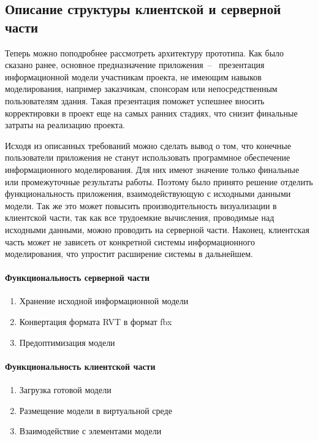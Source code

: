 ﻿\subsection{Описание структуры клиентской и серверной части}

Теперь можно поподробнее рассмотреть архитектуру прототипа.
Как было сказано ранее, основное предназначение приложения~--~
презентация информационной модели участникам проекта,
не имеющим навыков моделирования,
например заказчикам, спонсорам или непосредственным пользователям здания.
Такая презентация поможет успешнее вносить
корректировки в проект еще на самых ранних стадиях,
что снизит финальные затраты на реализацию проекта.

Исходя из описанных требований можно сделать вывод о том,
что конечные пользователи приложения не станут использовать
программное обеспечение информационного моделирования.
Для них имеют значение только финальные или промежуточные результаты работы.
Поэтому было принято решение отделить функциональность приложения,
взаимодействующую с исходными данными модели.
Так же это может повысить производительность визуализации в клиентской части,
так как все трудоемкие вычисления, проводимые над исходными данными,
можно проводить на серверной части.
Наконец, клиентская часть может не зависеть
от конкретной системы информационного моделирования,
что упростит расширение системы в дальнейшем.

\paragraph{Функциональность серверной части}

\begin{enumerate}
    \item Хранение исходной информационной модели
    \item Конвертация формата RVT в формат fbx
    \item Предоптимизация модели
\end{enumerate}

\paragraph{Функциональность клиентской части}

\begin{enumerate}
    \item Загрузка готовой модели
    \item Размещение модели в виртуальной среде
    \item Взаимодействие с элементами модели
\end{enumerate}


